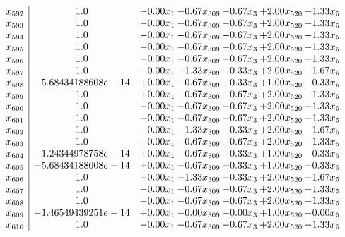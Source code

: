 \documentclass[8pt]{article}
\begin{document}
\[\begin{array}{c| c c@{\hskip 2pt} c@{\hskip 2pt} c@{\hskip 2pt} c@{\hskip 2pt} c@{\hskip 2pt} }
 x_{592}   &  1.0 & -0.00 x_{1} & -0.67 x_{309} & -0.67 x_{3} & +  2.00 x_{520} & -1.33 x_{5}\\
 x_{593}   &  1.0 & -0.00 x_{1} & -0.67 x_{309} & -0.67 x_{3} & +  2.00 x_{520} & -1.33 x_{5}\\
 x_{594}   &  1.0 & -0.00 x_{1} & -0.67 x_{309} & -0.67 x_{3} & +  2.00 x_{520} & -1.33 x_{5}\\
 x_{595}   &  1.0 & -0.00 x_{1} & -0.67 x_{309} & -0.67 x_{3} & +  2.00 x_{520} & -1.33 x_{5}\\
 x_{596}   &  1.0 & -0.00 x_{1} & -0.67 x_{309} & -0.67 x_{3} & +  2.00 x_{520} & -1.33 x_{5}\\
 x_{597}   &  1.0 & -0.00 x_{1} & -1.33 x_{309} & -0.33 x_{3} & +  2.00 x_{520} & -1.67 x_{5}\\
 x_{598}   &  -5.68434188608e-14 & +  0.00 x_{1} & -0.67 x_{309} & +  0.33 x_{3} & +  1.00 x_{520} & -0.33 x_{5}\\
 x_{599}   &  1.0 & +  0.00 x_{1} & -0.67 x_{309} & -0.67 x_{3} & +  2.00 x_{520} & -1.33 x_{5}\\
 x_{600}   &  1.0 & -0.00 x_{1} & -0.67 x_{309} & -0.67 x_{3} & +  2.00 x_{520} & -1.33 x_{5}\\
 x_{601}   &  1.0 & -0.00 x_{1} & -0.67 x_{309} & -0.67 x_{3} & +  2.00 x_{520} & -1.33 x_{5}\\
 x_{602}   &  1.0 & -0.00 x_{1} & -1.33 x_{309} & -0.33 x_{3} & +  2.00 x_{520} & -1.67 x_{5}\\
 x_{603}   &  1.0 & -0.00 x_{1} & -0.67 x_{309} & -0.67 x_{3} & +  2.00 x_{520} & -1.33 x_{5}\\
 x_{604}   &  -1.24344978758e-14 & +  0.00 x_{1} & -0.67 x_{309} & +  0.33 x_{3} & +  1.00 x_{520} & -0.33 x_{5}\\
 x_{605}   &  -5.68434188608e-14 & +  0.00 x_{1} & -0.67 x_{309} & +  0.33 x_{3} & +  1.00 x_{520} & -0.33 x_{5}\\
 x_{606}   &  1.0 & -0.00 x_{1} & -1.33 x_{309} & -0.33 x_{3} & +  2.00 x_{520} & -1.67 x_{5}\\
 x_{607}   &  1.0 & -0.00 x_{1} & -0.67 x_{309} & -0.67 x_{3} & +  2.00 x_{520} & -1.33 x_{5}\\
 x_{608}   &  1.0 & -0.00 x_{1} & -0.67 x_{309} & -0.67 x_{3} & +  2.00 x_{520} & -1.33 x_{5}\\
 x_{609}   &  -1.46549439251e-14 & +  0.00 x_{1} & -0.00 x_{309} & -0.00 x_{3} & +  1.00 x_{520} & -0.00 x_{5}\\
 x_{610}   &  1.0 & -0.00 x_{1} & -0.67 x_{309} & -0.67 x_{3} & +  2.00 x_{520} & -1.33 x_{5}\\

\end{array}\]
\end{document}
